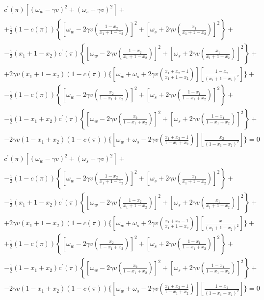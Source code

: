 \documentclass[12pt,a4paper]{article}
\begin{document}
\begin{eqnarray}
\label{focx1gen}
    \begin{split}
        c^\prime(\pi)\left[(\omega_w-\gamma v)^2+(\omega_s+\gamma v)^2\right]+ \\
        +\frac{1}{2}(1-c(\pi))\left\{\left[\omega_w-2\gamma v\left(\frac{1-x_2}{x_1+1-x_2}\right)\right]^2+\left[\omega_s+2\gamma v\left(\frac{x_1}{x_1+1-x_2}\right)\right]^2\right\}+ \\
        -\frac{1}{2}(x_1 + 1-x_2)c^\prime(\pi)\left\{\left[\omega_w-2\gamma v\left(\frac{1-x_2}{x_1+1-x_2}\right)\right]^2+\left[\omega_s+2\gamma v\left(\frac{x_1}{x_1+1-x_2}\right)\right]^2\right\}+ \\
        +2\gamma v(x_1 + 1-x_2)(1-c(\pi))\Bigg\{\left[\omega_w+\omega_s+2\gamma v\left(\frac{x_1+x_2-1}{x_1+1-x_2}\right)\right]\left[\frac{1-x_2}{(x_1+1-x_2)^2}\right]\Bigg\}+\\
        -\frac{1}{2}(1-c(\pi))\left\{\left[\omega_w-2\gamma v\left(\frac{x_2}{1-x_1+x_2}\right)\right]^2+\left[\omega_s+2\gamma v\left(\frac{1-x_1}{1-x_1+x_2}\right)\right]^2\right\}+\\
        -\frac{1}{2}(1-x_1 + x_2)c^\prime(\pi)\left\{\left[\omega_w-2\gamma v\left(\frac{x_2}{1-x_1+x_2}\right)\right]^2+\left[\omega_s+2\gamma v\left(\frac{1-x_1}{1-x_1+x_2}\right)\right]^2\right\}+\\
        -2\gamma v(1-x_1 + x_2)(1-c(\pi))\Bigg\{\left[\omega_w+\omega_s-2\gamma v\left(\frac{x_1+x_2-1}{1-x_1+x_2}\right)\right]\left[\frac{x_2}{(1-x_1+x_2)^2}\right]\Bigg\}=0
    \end{split} \\
    \label{focx2gen}
    \begin{split}
        c^\prime(\pi)\left[(\omega_w-\gamma v)^2+(\omega_s+\gamma v)^2\right]+ \\
        -\frac{1}{2}(1-c(\pi))\left\{\left[\omega_w-2\gamma v\left(\frac{1-x_2}{x_1+1-x_2}\right)\right]^2+\left[\omega_s+2\gamma v\left(\frac{x_1}{x_1+1-x_2}\right)\right]^2\right\}+ \\
        -\frac{1}{2}(x_1 + 1-x_2)c^\prime(\pi)\left\{\left[\omega_w-2\gamma v\left(\frac{1-x_2}{x_1+1-x_2}\right)\right]^2+\left[\omega_s+2\gamma v\left(\frac{x_1}{x_1+1-x_2}\right)\right]^2\right\}+ \\
        +2\gamma v(x_1 + 1-x_2)(1-c(\pi))\Bigg\{\left[\omega_w+\omega_s+2\gamma v\left(\frac{x_1+x_2-1}{x_1+1-x_2}\right)\right]\left[\frac{x_1}{(x_1+1-x_2)^2}\right]\Bigg\}+\\
        +\frac{1}{2}(1-c(\pi))\left\{\left[\omega_w-2\gamma v\left(\frac{x_2}{1-x_1+x_2}\right)\right]^2+\left[\omega_s+2\gamma v\left(\frac{1-x_1}{1-x_1+x_2}\right)\right]^2\right\}+\\
        -\frac{1}{2}(1-x_1 + x_2)c^\prime(\pi)\left\{\left[\omega_w-2\gamma v\left(\frac{x_2}{1-x_1+x_2}\right)\right]^2+\left[\omega_s+2\gamma v\left(\frac{1-x_1}{1-x_1+x_2}\right)\right]^2\right\}+\\
        -2\gamma v(1-x_1 + x_2)(1-c(\pi))\Bigg\{\left[\omega_w+\omega_s-2\gamma v\left(\frac{x_1+x_2-1}{1-x_1+x_2}\right)\right]\left[\frac{1-x_1}{(1-x_1+x_2)^2}\right]\Bigg\}=0
    \end{split}
\end{eqnarray}
\end{document}
